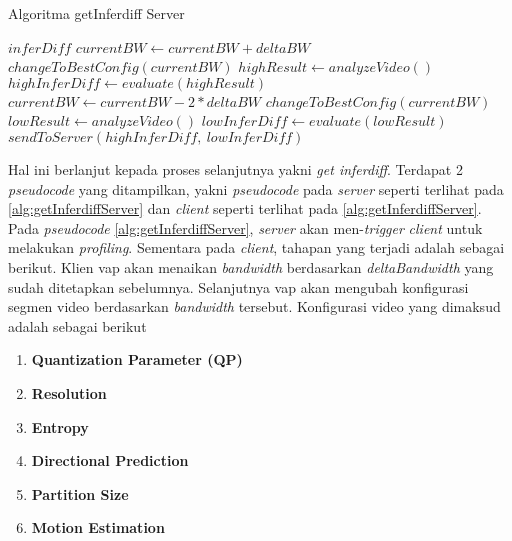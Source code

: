        \begin{algorithm}[tbh]
            \caption{Algoritma getInferdiff Server}\label{alg:getInferdiffServer}
            \begin{algorithmic}
                \Ensure $inferDiff$
                \State $currentBW \gets currentBW + deltaBW$
                \State $changeToBestConfig(currentBW)$
                \State $highResult \gets analyzeVideo()$
                \State $highInferDiff \gets evaluate(highResult)$
                \State $currentBW \gets currentBW - 2 * deltaBW$
                \State $changeToBestConfig(currentBW)$
                \State $lowResult \gets analyzeVideo()$
                \State $lowInferDiff \gets evaluate(lowResult)$
                \State $sendToServer(highInferDiff,\ lowInferDiff)$
                \EndProcedure
            \end{algorithmic}
        \end{algorithm}


        Hal ini berlanjut kepada proses selanjutnya yakni \textit{get inferdiff}. Terdapat 2 \textit{pseudocode} yang ditampilkan, yakni \textit{pseudocode} pada \textit{server} seperti terlihat pada \ref{alg:getInferdiffServer} dan \textit{client} seperti terlihat pada \ref{alg:getInferdiffServer}.
        Pada \textit{pseudocode} \ref{alg:getInferdiffServer}, \textit{server} akan men-\textit{trigger} \textit{client} untuk melakukan \textit{profiling}. Sementara pada \textit{client}, tahapan yang terjadi adalah sebagai berikut.
        Klien \gls{vap} akan menaikan \textit{bandwidth} berdasarkan \textit{deltaBandwidth} yang sudah ditetapkan sebelumnya. Selanjutnya \gls{vap} akan mengubah konfigurasi segmen video berdasarkan \textit{bandwidth} tersebut.
        Konfigurasi video yang dimaksud adalah sebagai berikut

        \begin{enumerate}
            \item \textbf{Quantization Parameter (QP)}
            \item \textbf{Resolution}
            \item \textbf{Entropy}
            \item \textbf{Directional Prediction}
            \item \textbf{Partition Size}
            \item \textbf{Motion Estimation}
        \end{enumerate}

